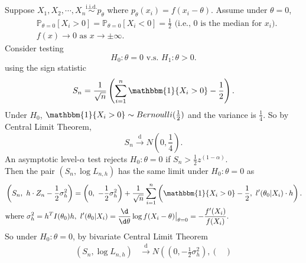\documentclass[a4paper]{article}
\begin{document}
\begin{eg}
	Suppose $X_1,X_2,\cdots,X_n \stackrel{\text{i.i.d.}}{\sim} p_{\theta}$ where $p_{\theta}(x_i) = f(x_i - \theta)$. Assume under $\theta = 0$,
	\begin{equation*}
		\begin{aligned}
			& \mathbb{P}_{\theta = 0} [X_i > 0] = \mathbb{P}_{\theta = 0} [X_i < 0] = \frac{1}{2} \text{ (i.e., $0$ is the median for $x_i$)}. \\
			& f(x) \to 0 \text{ as } x \to \pm \infty.
		\end{aligned}
	\end{equation*}
	Consider testing
	\begin{equation*}
		H_0: \theta = 0 \text{ v.s. } H_1: \theta > 0.
	\end{equation*}
	using the sign statistic
	\begin{equation*}
		S_n = \frac{1}{\sqrt{n}} \left(\sum\limits_{i=1}^n \mathbbm{1} \{X_i > 0\} - \frac{1}{2}\right).
	\end{equation*}
	Under $H_0$, $\mathbbm{1} \{X_i > 0\} \sim Bernoulli(\frac{1}{2})$ and the variance is $\frac{1}{4}$. So by Central Limit Theorem,
	\begin{equation*}
		S_n \stackrel{\text{d}}{\longrightarrow} N(0,\frac{1}{4}).
	\end{equation*}
	An asymptotic level-$\alpha$ test rejects $H_0: \theta = 0$ if $S_n > \frac{1}{2} z^{(1-\alpha)}$. \\
	Then the pair $(S_n,\log L_{n,h})$ has the same limit under $H_0: \theta = 0$ as
	\begin{equation*}
		\begin{aligned}
			&\left(S_n,\ h \cdot Z_n - \frac{1}{2} \sigma_h^2\right) = \left(0,\ -\frac{1}{2} \sigma_h^2\right) + \frac{1}{\sqrt{n}} \sum\limits_{i=1}^n \left(\mathbbm{1} \{X_i > 0\} - \frac{1}{2}, \ l'(\theta_0|X_i) \cdot h\right). \\
			& \text{where } \sigma_h^2 = h^T I(\theta_0) h , \ l'(\theta_0|X_i) = \frac{\d}{\d \theta} \log f(X_i - \theta) \big|_{\theta = 0} = -\frac{f'(X_i)}{f(X_i)}.
		\end{aligned}
	\end{equation*}
	So under $H_0: \theta = 0$, by bivariate Central Limit Theorem
	\begin{equation*}
		\begin{aligned}
			\left(S_n,\log L_{n,h}\right) & \stackrel{\text{d}}{\longrightarrow} N \left(\left(0,-\frac{1}{2} \sigma_h^2\right),
			\begin{pmatrix}

\end{pmatrix}
\end{aligned}
\end{equation*}
\end{eg}
\end{document}
